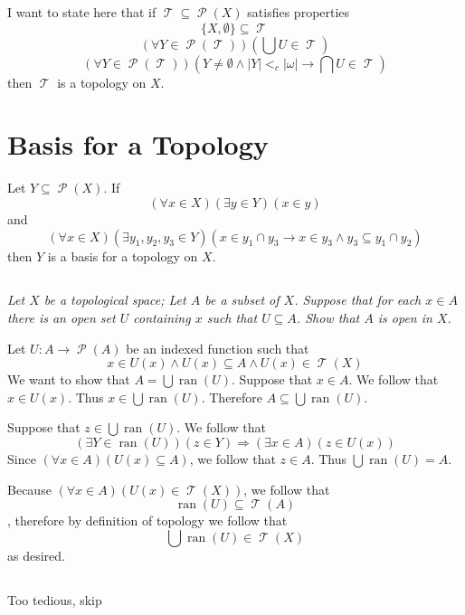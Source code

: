 \documentclass[11pt,oneside,titlepage]{book}
\DeclareMathOperator \pow {\mathcal {P}}
\DeclareMathOperator \topol {\mathcal {T}}
\DeclareMathOperator \ra {\Rightarrow}
\DeclareMathOperator \ran {ran}
\newcommand{\set}[1]{\{ #1 \}}
\begin{document}
I want to state here that if $\topol \subseteq \pow(X)$ satisfies
properties
$$\set{X, \emptyset} \subseteq \topol$$
$$(\forall Y \in \pow(\topol))( \bigcup{U} \in \topol)$$
$$(\forall Y \in \pow(\topol))(Y \neq \emptyset \land |Y| <_c
|\omega|  \to \bigcap{U} \in \topol)$$
then $\topol$ is a topology on $X$.

\section{Basis for a Topology}

Let $Y \subseteq \pow(X)$. If
$$(\forall x \in X)(\exists y \in Y)(x \in y)$$
and
$$(\forall x \in X)(\exists y_1, y_2, y_3 \in Y)(x \in y_1 \cap y_3 \to
x \in y_3 \land y_3 \subseteq y_1 \cap y_2)$$
then $Y$ is a basis for a topology on $X$.

\subsection{}

\textit{Let $X$ be a topological space; Let $A$ be a subset of $X$. Suppose that for each
  $x \in A$ there is an open set $U$ containing $x$ such that $U \subseteq A$. Show that $A$ is
  open in $X$.}

Let $U: A \to \pow(A)$ be an indexed function such that 
$$x \in U(x) \land U(x) \subseteq A \land U(x) \in \topol(X)$$
We want to show that $A = \bigcup{\ran(U)}$. Suppose that $x \in A$. We follow that
$x \in U(x)$. Thus $x \in \bigcup{\ran(U)}$. Therefore $A \subseteq \bigcup{\ran(U)}$.

Suppose that $z \in \bigcup{\ran(U)}$. We follow that
$$(\exists Y \in \ran(U))(z \in Y) \ra
(\exists x \in A)(z \in U(x))$$
Since $(\forall x \in A)(U(x) \subseteq A)$, we follow that $z \in A$. Thus
$\bigcup{\ran(U)} = A$.

Because $(\forall x \in A)(U(x) \in \topol(X))$, we follow that
$$\ran(U) \subseteq \topol(A)$$, therefore by definition of topology we follow that
$$\bigcup{\ran(U)} \in \topol(X)$$
as desired.

\subsection{}

Too tedious, skip

\subsection{}
\end{document}
